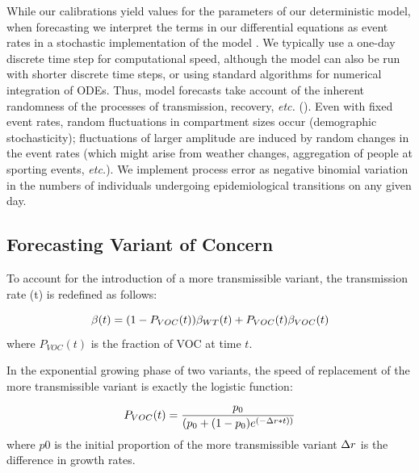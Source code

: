 \documentclass[12pt]{article}\usepackage[]{graphicx}\usepackage[]{color}
\begin{document}
While our calibrations yield values for the parameters of our
deterministic model, when forecasting we interpret the terms in our
differential equations as event rates in a stochastic implementation
of the model \cite{Gill76,Gill01,Gill07}. We typically use a one-day
discrete time step for computational speed, although the model can
also be run with shorter discrete time steps, or using standard
algorithms for numerical integration of ODEs.  Thus, model forecasts
take account of the inherent randomness of the processes of
transmission, recovery, \emph{etc.}  ().  Even
with fixed event rates, random fluctuations in compartment sizes occur
(demographic stochasticity); fluctuations of larger amplitude are
induced by random changes in the event rates (which might arise from
weather changes, aggregation of people at sporting events,
\emph{etc.}). We implement
process error as negative binomial variation in the numbers of
individuals undergoing epidemiological transitions on any given
day.

\subsection*{Forecasting Variant of Concern}

To account for the introduction of a more transmissible variant, the transmission rate \B(t) is redefined as follows:

\begin{equation}
\beta(t) = (1 -  P_{VOC}(t))\beta_{WT}(t) + P_{VOC}(t)\beta_{VOC}(t)
\end{equation}
where $P_{VOC}(t)$ is the fraction of VOC at time $t$.

In the exponential growing phase of two variants, the speed of replacement of the more transmissible variant is exactly the logistic function:

\begin{equation}
P_{VOC}(t) = \frac{p_0}{(p_0+(1-p_0)e^{(-\Delta r*t))}}
\end{equation}
where $p0$ is the initial proportion of the more transmissible variant $\Delta r$ is the difference in growth rates.
\end{document}
